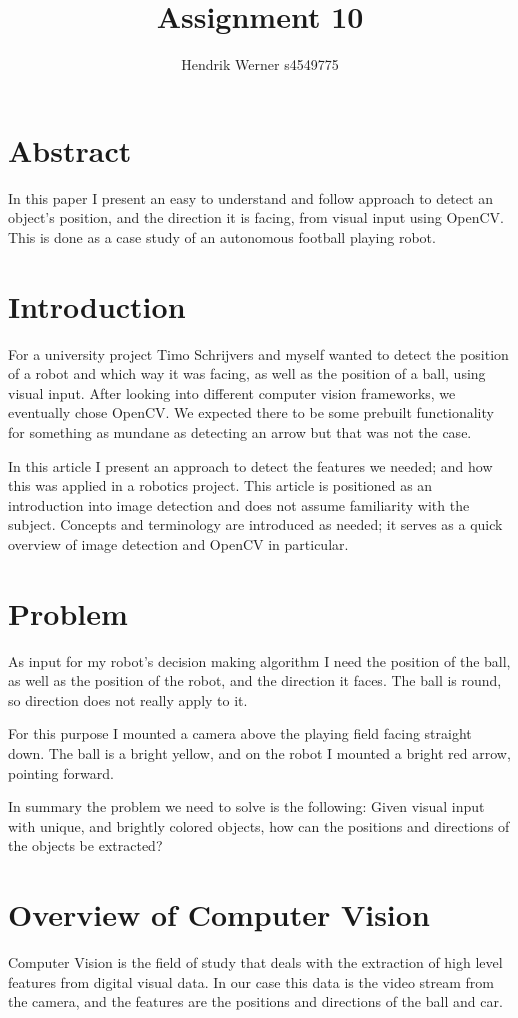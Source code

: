 \documentclass[12pt, a4paper]{article}
\title{Assignment 10}
\author{Hendrik Werner s4549775}
\begin{document}
\maketitle

\section{Abstract}
In this paper I present an easy to understand and follow approach to detect an object's position, and the direction it is facing, from visual input using OpenCV. This is done as a case study of an autonomous football playing robot.

\section{Introduction}
For a university project Timo Schrijvers and myself wanted to detect the position of a robot and which way it was facing, as well as the position of a ball, using visual input. After looking into different computer vision frameworks, we eventually chose OpenCV. We expected there to be some prebuilt functionality for something as mundane as detecting an arrow but that was not the case.

In this article I present an approach to detect the features we needed; and how this was applied in a robotics project. This article is positioned as an introduction into image detection and does not assume familiarity with the subject. Concepts and terminology are introduced as needed; it serves as a quick overview of image detection and OpenCV in particular.

\section{Problem}
As input for my robot's decision making algorithm I need the position of the ball, as well as the position of the robot, and the direction it faces. The ball is round, so direction does not really apply to it.

For this purpose I mounted a camera above the playing field facing straight down. The ball is a bright yellow, and on the robot I mounted a bright red arrow, pointing forward.

In summary the problem we need to solve is the following: Given visual input with unique, and brightly colored objects, how can the positions and directions of the objects be extracted?

\section{Overview of Computer Vision}
Computer Vision is the field of study that deals with the extraction of high level features from digital visual data. In our case this data is the video stream from the camera, and the features are the positions and directions of the ball and car.
\end{document}
